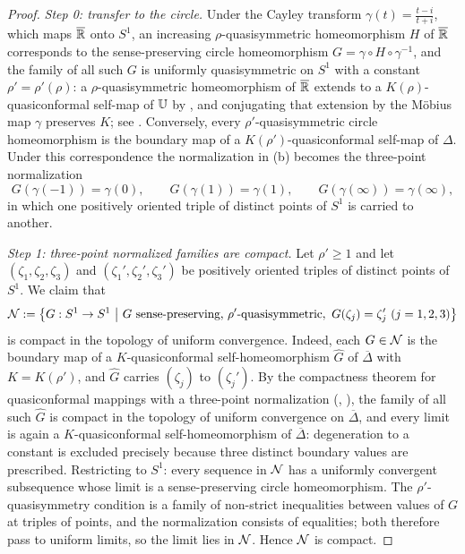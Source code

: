 \begin{proof}
	\emph{Step 0: transfer to the circle.}
	Under the Cayley transform $\gamma(t)=\frac{t-i}{t+i}$, which maps
	$\overline{\mathbb{R}}$ onto $S^1$, an increasing $\rho$-quasisymmetric homeomorphism $H$
	of $\overline{\mathbb{R}}$ corresponds to the sense-preserving circle homeomorphism
	$G=\gamma\circ H\circ\gamma^{-1}$, and the family of all such $G$ is uniformly
	quasisymmetric on $S^1$ with a constant $\rho'=\rho'(\rho)$: a
	$\rho$-quasisymmetric homeomorphism of $\overline{\mathbb{R}}$ extends to a
	$K(\rho)$-quasiconformal self-map of $\mathbb{U}$ by \cite{BA}, and conjugating that
	extension by the M\"obius map $\gamma$ preserves $K$; see \cite[Ch.~I]{LV}.
	Conversely, every $\rho'$-quasisymmetric circle homeomorphism is the boundary
	map of a $K(\rho')$-quasiconformal self-map of $\Delta$. Under this
	correspondence the normalization in (b) becomes the three-point normalization
	\[
	G(\gamma(-1))=\gamma(0),\qquad G(\gamma(1))=\gamma(1),\qquad
	G(\gamma(\infty))=\gamma(\infty),
	\]
	in which one positively oriented triple of distinct points of $S^1$ is carried
	to another.
	
	\emph{Step 1: three-point normalized families are compact.}
	Let $\rho'\ge1$ and let $(\zeta_1,\zeta_2,\zeta_3)$ and
	$(\zeta_1',\zeta_2',\zeta_3')$ be positively oriented triples of distinct
	points of $S^1$. We claim that
	\[
	\calN:=\bigl\{G:S^1\to S^1\ \big|\ G\ \text{sense-preserving,
	}\rho'\text{-quasisymmetric},\ G(\zeta_j)=\zeta_j'\ (j=1,2,3)\bigr\}
	\]
	is compact in the topology of uniform convergence. Indeed, each $G\in\mathcal{N}$ is
	the boundary map of a $K$-quasiconformal self-homeomorphism $\widehat G$ of
	$\overline\Delta$ with $K=K(\rho')$, and $\widehat G$ carries $(\zeta_j)$ to
	$(\zeta_j')$. By the compactness theorem for quasiconformal mappings with a
	three-point normalization (\cite[Ch.~II, \S5]{LV}, \cite[Ch.~II]{Ah}), the
	family of all such $\widehat G$ is compact in the topology of uniform
	convergence on $\overline\Delta$, and every limit is again a
	$K$-quasiconformal self-homeomorphism of $\overline\Delta$: degeneration to a
	constant is excluded precisely because three distinct boundary values are
	prescribed. Restricting to $S^1$: every sequence in $\mathcal{N}$ has a uniformly
	convergent subsequence whose limit is a sense-preserving circle
	homeomorphism. The $\rho'$-quasisymmetry condition is a family of non-strict
	inequalities between values of $G$ at triples of points, and the normalization
	consists of equalities; both therefore pass to uniform limits, so the limit
	lies in $\mathcal{N}$. Hence $\mathcal{N}$ is compact.
	

\end{proof}
